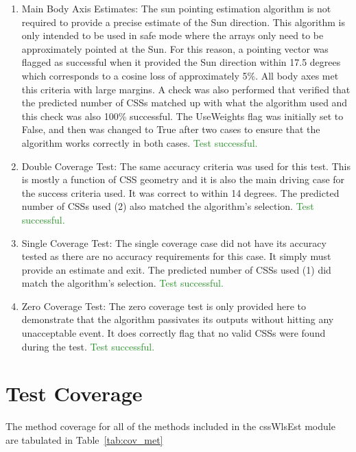 \documentclass[]{LASPreport}
\begin{document}
\begin{enumerate}
\item{Main Body Axis Estimates: The sun pointing estimation algorithm is not 
   required to provide a precise estimate of the Sun direction.  This algorithm 
   is only intended to be used in safe mode where the arrays only need to be 
   approximately pointed at the Sun.  For this reason, a pointing vector 
   was flagged as successful when it provided the Sun direction within 17.5 
   degrees which corresponds to a cosine loss of approximately 5\%.  All body 
   axes met this criteria with large margins.  A check was also performed that 
   verified that the predicted number of CSSs matched up with what the 
   algorithm used and this check was also 100\% successful.  The UseWeights flag 
   was initially set to False, and then was changed to True after two cases to 
   ensure that the algorithm works correctly in both cases. 
    \textcolor{ForestGreen}{Test successful.}}
\item{Double Coverage Test: The same accuracy criteria was used for this test.  
   This is mostly a function of CSS geometry and it is also the main driving 
   case for the success criteria used.  It was correct to within 14 degrees. 
   The predicted number of CSSs used (2) also matched the algorithm's selection. 
    \textcolor{ForestGreen}{Test successful.}}
\item{Single Coverage Test: The single coverage case did not have its accuracy 
   tested as there are no accuracy requirements for this case.  It simply must 
   provide an estimate and exit.  The predicted number of CSSs used (1) did  
   match the algorithm's selection.  \textcolor{ForestGreen}{Test successful.}}
\item{Zero Coverage Test: The zero coverage test is only provided here to 
   demonstrate that the algorithm passivates its outputs without hitting any 
   unacceptable event.  It does correctly flag that no valid CSSs were found 
   during the test. \textcolor{ForestGreen}{Test successful.}}
\end{enumerate}

\section{Test Coverage}
The method coverage for all of the methods included in the cssWlsEst 
module are tabulated in Table~\ref{tab:cov_met}
\end{document}

